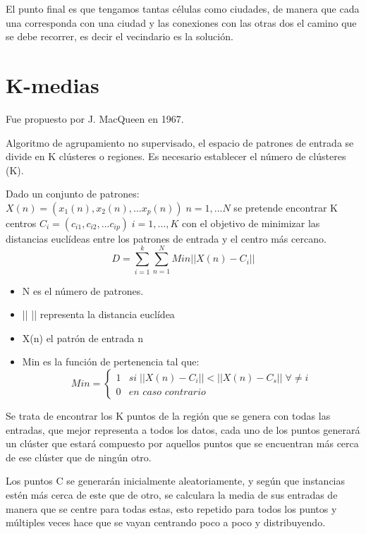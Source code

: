 \documentclass[12pt, twoside, openright]{report} %
\begin{document}
El punto final es que tengamos tantas células como ciudades, de manera que cada una corresponda con una ciudad y las conexiones con las otras dos el camino que se debe recorrer, es decir el vecindario es la solución.

\section{K-medias}
Fue propuesto por J. MacQueen en 1967.

Algoritmo de agrupamiento no supervisado, el espacio de patrones de entrada se divide en K clústeres o regiones. Es necesario establecer el número de clústeres (K).

Dado un conjunto de patrones: $X(n)=(x_1(n), x_2(n), ...x_p(n))\; n=1, ... N$ se pretende encontrar K centros $C_i = (c_{i1},c_{i2}, ...c_{ip})\; i = 1, ..., K$ con el objetivo de minimizar las distancias euclídeas entre los patrones de entrada y el centro más cercano.
$$D=\sum^k_{i=1}\sum^N_{n=1} Min ||X(n) - C_i||$$
\begin{itemize}
	\item N es el número de patrones.
	\item || || representa la distancia euclídea
	\item X(n) el patrón de entrada n
	\item Min es la función de pertenencia tal que:
	$$Min = \begin{cases}
		1 & si \; ||X(n) - C_i|| < || X(n) - C_s || \; \forall \neq i \\
		0 & \textit{en caso contrario}
	\end{cases}$$
\end{itemize}

Se trata de encontrar los K puntos de la región que se genera con todas las entradas, que mejor representa a todos los datos, cada uno de los puntos generará un clúster que estará compuesto por aquellos puntos que se encuentran más cerca de ese clúster que de ningún otro.

Los puntos C se generarán inicialmente aleatoriamente, y según que instancias estén más cerca de este que de otro, se calculara la media de sus entradas de manera que se centre para todas estas, esto repetido para todos los puntos y múltiples veces hace que se vayan centrando poco a poco y distribuyendo.
\pagebreak
\end{document}
